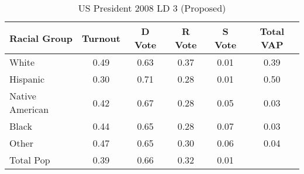 \begin{table}[htb]
\begin{center}
\caption{US President 2008 LD 3 (Proposed)}
\label{pres08_vap_ld_3}
\begin{tabular}{lccccc}
  \hline
Racial Group & Turnout & D Vote & R Vote & S Vote & Total VAP \\ 
  \hline
White & 0.49 & 0.63 & 0.37 & 0.01 & 0.39 \\ 
  Hispanic & 0.30 & 0.71 & 0.28 & 0.01 & 0.50 \\ 
  Native American & 0.42 & 0.67 & 0.28 & 0.05 & 0.03 \\ 
  Black & 0.44 & 0.65 & 0.28 & 0.07 & 0.03 \\ 
  Other & 0.47 & 0.65 & 0.30 & 0.06 & 0.04 \\ 
  Total Pop & 0.39 & 0.66 & 0.32 & 0.01 &  \\ 
   \hline
\end{tabular}
\end{center}
\end{table}
